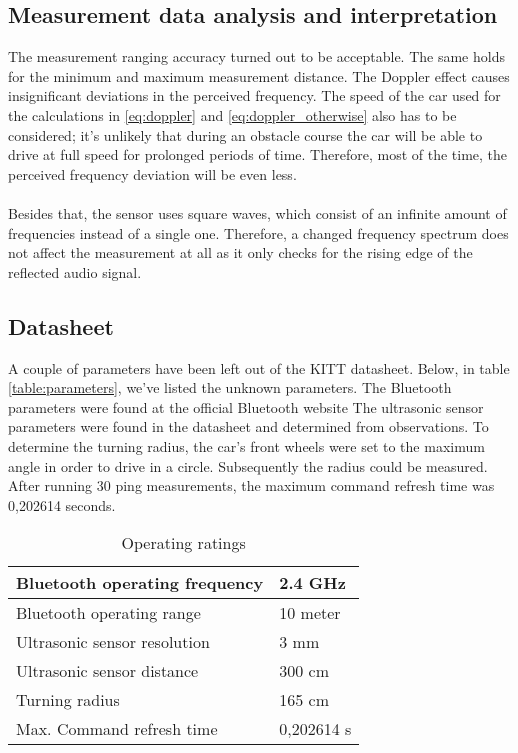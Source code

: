\documentclass[final]{scrreprt} %
\begin{document}
\subsection{Measurement data analysis and interpretation}

The measurement ranging accuracy turned out to be acceptable. 
The same holds for the minimum and maximum measurement distance. 
The Doppler effect causes insignificant deviations in the perceived frequency. 
The speed of the car used for the calculations in \ref{eq:doppler} and \ref{eq:doppler_otherwise} also has to be considered; it's unlikely that during an obstacle course the car will be able to drive at full speed for prolonged periods of time.
Therefore, most of the time, the perceived frequency deviation will be even less.
\\ \\
Besides that, the sensor uses square waves, which consist of an infinite amount of frequencies instead of a single one.
Therefore, a changed frequency spectrum does not affect the measurement at all as it only checks for the rising edge of the reflected audio signal.

\subsection{Datasheet}

A couple of parameters have been left out of the KITT datasheet. Below, in table \ref{table:parameters}, we've listed the unknown parameters. 
The Bluetooth parameters were found at the official Bluetooth website %
The ultrasonic sensor parameters were found in the datasheet and determined from observations. 
To determine the turning radius, the car's front wheels were set to the maximum angle in order to drive in a circle. Subsequently the radius could be measured. 
After running 30 ping measurements, the maximum command refresh time was 0,202614 seconds.

\begin{table}[H]
\begin{center}
\begin{tabular}{ | l | l |}
    \hline
    Bluetooth operating frequency & 2.4 GHz \\ \hline
    Bluetooth operating range & 10 meter \\\hline
    Ultrasonic sensor resolution    & 3 mm \\\hline
    Ultrasonic sensor distance	         & 300 cm \\\hline
    Turning radius & 165 cm \\\hline
    Max. Command refresh time & 0,202614 s\\\hline
\end{tabular}
\caption{Operating ratings}
\end{center}
\end{table}
\label{table:parameters}
\end{document}
